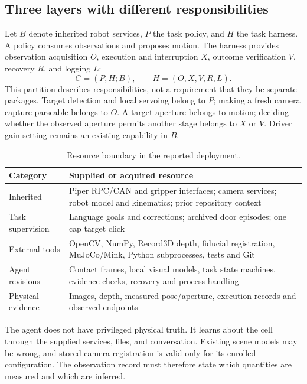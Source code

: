 \subsection{Three layers with different responsibilities}
Let $B$ denote inherited robot services, $P$ the task policy, and $H$ the task
harness. A policy consumes observations and proposes motion. The harness
provides observation acquisition $O$, execution and interruption $X$, outcome
verification $V$, recovery $R$, and logging $L$:
\begin{equation}
 C=(P,H;B),\qquad H=(O,X,V,R,L).
\label{eq:artifact}
\end{equation}
This partition describes responsibilities, not a requirement that they be
separate packages. Target detection and local servoing belong to $P$; making
a fresh camera capture parseable belongs to $O$. A target aperture belongs to
motion; deciding whether the observed aperture permits another stage belongs
to $X$ or $V$. Driver gain setting remains an existing capability in $B$.

\begin{table}[t]\centering\small
\caption{Resource boundary in the reported deployment.}
\label{tab:boundary}
\begin{tabularx}{\columnwidth}{lY}\toprule
Category & Supplied or acquired resource\\\midrule
Inherited & Piper RPC/CAN and gripper interfaces; camera services; robot model and kinematics; prior repository context\\
Task supervision & Language goals and corrections; archived door episodes; one cap target click\\
External tools & OpenCV, NumPy, Record3D depth, fiducial registration, MuJoCo/Mink, Python subprocesses, tests and Git\\
Agent revisions & Contact frames, local visual models, task state machines, evidence checks, recovery and process handling\\
Physical evidence & Images, depth, measured pose/aperture, execution records and observed endpoints\\\bottomrule
\end{tabularx}
\end{table}

The agent does not have privileged physical truth. It learns about the cell
through the supplied services, files, and conversation. Existing scene models
may be wrong, and stored camera registration is valid only for its enrolled
configuration. The observation record must therefore state which quantities
are measured and which are inferred.

